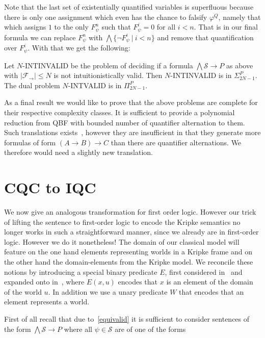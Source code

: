\documentclass[a4paper,UKenglish,cleveref, autoref, thm-restate]{lipics-v2021}
\begin{document}
Note that the last set of existentially quantified variables is superfluous because there is only one assignment which even has the chance to falsify $\varphi^Q$, namely that which assigns $1$ to the only $F_\psi^n$ such that $F_\psi^i = 0$ for all $i < n$. That is in our final formula we can replace $F_\psi^n$ with $\bigwedge\{\neg F_\psi^i\:|\:i < n\}$ and remove that quantification over $F_\psi^i$. With that we get the following:

\begin{corollary}
	Let $N$-INTINVALID be the problem of deciding if a formula $\bigwedge \mathcal S\to P$ as above with $|\mathcal F_\to|\leq N$ is not intuitionistically valid. Then $N$-INTINVALID is in $\Sigma_{2N-1}^P$. The dual problem $N$-INTVALID is in $\Pi_{2N-1}^P$.
\end{corollary}

As a final result we would like to prove that the above problems are complete for their respective complexity classes. It is sufficient to provide a polynomial reduction from QBF with bounded number of quantifier alternation to them. Such translations exists~\cite{statman1979intuitionistic,vsvejdar2003polynomial}, however they are insufficient in that they generate more formulas of form $(A\to B)\to C$ than there are quantifier alternations. We therefore would need a slightly new translation.

\section{CQC to IQC}

We now give an analogous transformation for first order logic. However our trick of lifting the sentence to first-order logic to encode the Kripke semantics no longer works in such a straightforward manner, since we already are in first-order logic. However we do it nonetheless! The domain of our classical model will feature on the one hand elements representing worlds in a Kripke frame and on the other hand the domain-elements from the Kripke model. We reconcile these notions by introducing a special binary predicate $E$, first considered in~\cite{baaz2006skolemization} and expanded onto in~\cite{iemhoff2010eskolemization}, where $E(x, u)$ encodes that $x$ is an element of the domain of the world $u$. In addition we use a unary predicate $W$ that encodes that an element represents a world.

First of all recall that due to~\ref{equivalid} it is sufficient to consider sentences of the form $\bigwedge\mathcal S\to P$ where all $\psi\in\mathcal S$ are of one of the forms
\end{document}
